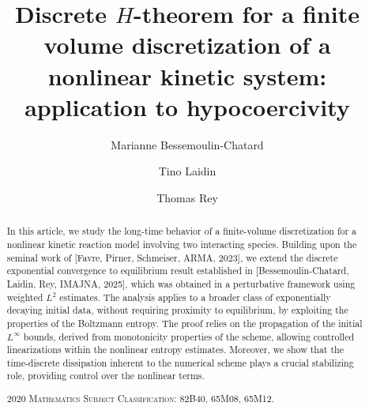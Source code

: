 \documentclass[reqno]{amsart}
\title[Entropy-dissipating scheme for a nonlinear kinetic model]{Discrete $H$-theorem for a finite volume discretization of a nonlinear kinetic system: application to hypocoercivity}
\author{Marianne Bessemoulin-Chatard}
\author{Tino Laidin}
\author{Thomas Rey}
\numberwithin{equation}{section}
\begin{document}
\begin{abstract}
    In this article, we study the long-time behavior of a finite-volume discretization for a nonlinear kinetic reaction model involving two interacting species. Building upon the seminal work of [Favre, Pirner, Schmeiser, ARMA, 2023], we extend the discrete exponential convergence to equilibrium result established in [Bessemoulin-Chatard, Laidin, Rey, IMAJNA, 2025], which was obtained in a perturbative framework using weighted $L^2$ estimates. The analysis applies to a broader class of exponentially decaying initial data, without requiring proximity to equilibrium, by exploiting the properties of the Boltzmann entropy. The proof relies on the propagation of the initial $L^\infty$ bounds, derived from monotonicity properties of the scheme, allowing controlled linearizations within the nonlinear entropy estimates. Moreover, we show that the time-discrete dissipation inherent to the numerical scheme plays a crucial stabilizing role, providing control over the nonlinear terms.
    
    \textsc{2020 Mathematics Subject Classification:} 82B40, %
    65M08, %
    65M12. %
\end{abstract}


\end{document}
